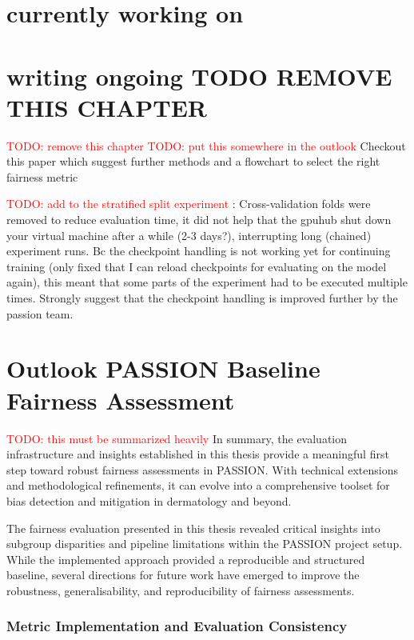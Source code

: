 \documentclass[12pt, a4paper, oneside]{book}   	%
\renewcommand{\todo}[1]{\textcolor{red}{TODO: #1}}
\begin{document}
	
	\chapter{currently working on}
	
	

	\chapter{writing ongoing TODO REMOVE THIS CHAPTER}\todo{remove this chapter}
	\todo{put this somewhere in the outlook} Checkout this paper which suggest further methods and a flowchart to select the right fairness metric \textcite{Barr_2025}
	
	
	\todo{add to the stratified split experiment }: Cross-validation folds were removed to reduce evaluation time, it did not help that the gpuhub shut down your virtual machine after a while (2-3 days?), interrupting long (chained) experiment runs. Bc the checkpoint handling is not working yet for continuing training (only fixed that I can reload checkpoints for evaluating on the model again), this meant that some parts of the experiment had to be executed multiple times. Strongly suggest that the checkpoint handling is improved further by the passion team.
	
	
	\chapter{Outlook PASSION Baseline Fairness Assessment}
	\todo{this must be summarized heavily}
	In summary, the evaluation infrastructure and insights established in this thesis provide a meaningful first step toward robust fairness assessments in PASSION. With technical extensions and methodological refinements, it can evolve into a comprehensive toolset for bias detection and mitigation in dermatology and beyond.
	
	The fairness evaluation presented in this thesis revealed critical insights into subgroup disparities and pipeline limitations within the PASSION project setup. While the implemented approach provided a reproducible and structured baseline, several directions for future work have emerged to improve the robustness, generalisability, and reproducibility of fairness assessments.
	
	\subsection{Metric Implementation and Evaluation Consistency}
	
\end{document}
